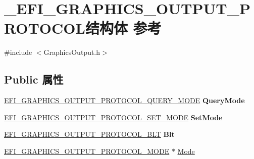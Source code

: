 \hypertarget{struct___e_f_i___g_r_a_p_h_i_c_s___o_u_t_p_u_t___p_r_o_t_o_c_o_l}{}\section{\+\_\+\+E\+F\+I\+\_\+\+G\+R\+A\+P\+H\+I\+C\+S\+\_\+\+O\+U\+T\+P\+U\+T\+\_\+\+P\+R\+O\+T\+O\+C\+O\+L结构体 参考}
\label{struct___e_f_i___g_r_a_p_h_i_c_s___o_u_t_p_u_t___p_r_o_t_o_c_o_l}


{\ttfamily \#include $<$Graphics\+Output.\+h$>$}

\subsection*{Public 属性}
\begin{DoxyCompactItemize}
\item 
\mbox{\label{struct___e_f_i___g_r_a_p_h_i_c_s___o_u_t_p_u_t___p_r_o_t_o_c_o_l_a7f6d894657c37c283b42bed87fdbb71f}} 
\hyperlink{_graphics_output_8h_aa905b6577b1322324724dcef5fed814b}{E\+F\+I\+\_\+\+G\+R\+A\+P\+H\+I\+C\+S\+\_\+\+O\+U\+T\+P\+U\+T\+\_\+\+P\+R\+O\+T\+O\+C\+O\+L\+\_\+\+Q\+U\+E\+R\+Y\+\_\+\+M\+O\+DE} {\bfseries Query\+Mode}
\item 
\mbox{\label{struct___e_f_i___g_r_a_p_h_i_c_s___o_u_t_p_u_t___p_r_o_t_o_c_o_l_afc6f1f4b480470a1c6d3eb5ba24ae932}} 
\hyperlink{_graphics_output_8h_afe1192df4f66065cf53dabbeb6eee89c}{E\+F\+I\+\_\+\+G\+R\+A\+P\+H\+I\+C\+S\+\_\+\+O\+U\+T\+P\+U\+T\+\_\+\+P\+R\+O\+T\+O\+C\+O\+L\+\_\+\+S\+E\+T\+\_\+\+M\+O\+DE} {\bfseries Set\+Mode}
\item 
\mbox{\label{struct___e_f_i___g_r_a_p_h_i_c_s___o_u_t_p_u_t___p_r_o_t_o_c_o_l_ae700dace3430a73555bebb041b4b15f9}} 
\hyperlink{_graphics_output_8h_abd98cf87dd41352bb06a7648af0c3e00}{E\+F\+I\+\_\+\+G\+R\+A\+P\+H\+I\+C\+S\+\_\+\+O\+U\+T\+P\+U\+T\+\_\+\+P\+R\+O\+T\+O\+C\+O\+L\+\_\+\+B\+LT} {\bfseries Blt}
\item 
\hyperlink{struct_e_f_i___g_r_a_p_h_i_c_s___o_u_t_p_u_t___p_r_o_t_o_c_o_l___m_o_d_e}{E\+F\+I\+\_\+\+G\+R\+A\+P\+H\+I\+C\+S\+\_\+\+O\+U\+T\+P\+U\+T\+\_\+\+P\+R\+O\+T\+O\+C\+O\+L\+\_\+\+M\+O\+DE} $\ast$ \hyperlink{struct___e_f_i___g_r_a_p_h_i_c_s___o_u_t_p_u_t___p_r_o_t_o_c_o_l_ae5fe3c5d2a77b3e1de618adfb0f2e20a}{Mode}
\end{DoxyCompactItemize}


